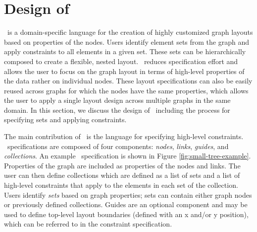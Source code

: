 \section{Design of \projectname}

\projectname\ is a domain-specific language for the creation of highly
customized graph layouts based on properties of the nodes. Users identify
element sets from the graph and apply constraints to all elements in a
given set. These sets can be hierarchically composed to create a flexible,
nested layout. \projectname\ reduces specification effort and allows the
user to focus on the graph layout in terms of high-level properties of the
data rather on individual nodes. These layout specifications can also be
easily reused across graphs for which the nodes have the same properties,
which allows the user to apply a single layout design across multiple
graphs in the same domain. In this section, we discuss the design of
\projectname\ including the process for specifying sets and applying
constraints.


\smallTreeExample

The main contribution of \projectname\ is the language for specifying
high-level constraints. \projectname\ specifications are composed of four
components: \emph{nodes}, \emph{links}, \emph{guides}, and
\emph{collections}. An example \projectname\ specification is shown in
Figure \ref{fig:small-tree-example}. Properties of the graph are included
as properties of the nodes and links. The user can then define collections
which are defined as a list of sets and a list of high-level constraints
that apply to the elements in each set of the collection. Users identify
\emph{sets} based on graph properties; sets can contain either graph nodes
or previously defined collections. Guides are an optional component and may
be used to define top-level layout boundaries (defined with an x and/or y
position), which can be referred to in the constraint specification.


